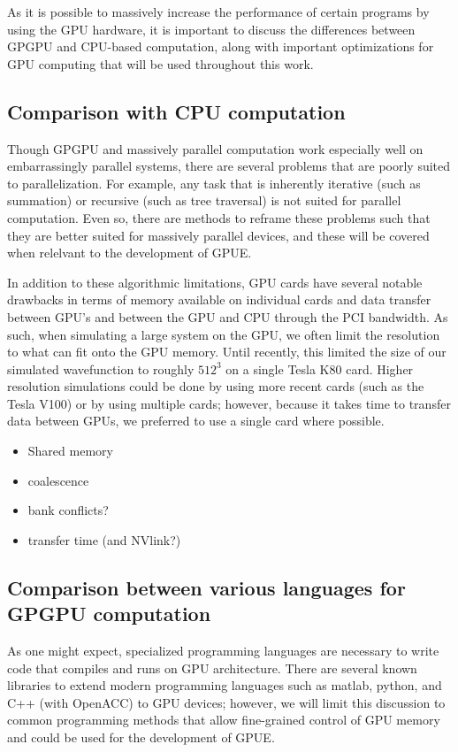 As it is possible to massively increase the performance of certain programs by using the GPU hardware, it is important to discuss the differences between GPGPU and CPU-based computation, along with important optimizations for GPU computing that will be used throughout this work.

\subsection{Comparison with CPU computation}

Though GPGPU and massively parallel computation work especially well on embarrassingly parallel systems, there are several problems that are poorly suited to parallelization.
For example, any task that is inherently iterative (such as summation) or recursive (such as tree traversal) is not suited for parallel computation.
Even so, there are methods to reframe these problems such that they are better suited for massively parallel devices, and these will be covered when relelvant to the development of GPUE.

In addition to these algorithmic limitations, GPU cards have several notable drawbacks in terms of memory available on individual cards and data transfer between GPU's and between the GPU and CPU through the PCI bandwidth.
As such, when simulating a large system on the GPU, we often limit the resolution to what can fit onto the GPU memory.
Until recently, this limited the size of our simulated wavefunction to roughly $512^3$ on a single Tesla K80 card.
Higher resolution simulations could be done by using more recent cards (such as the Tesla V100) or by using multiple cards; however, because it takes time to transfer data between GPUs, we preferred to use a single card where possible.

\begin{itemize}
\item Shared memory
\item coalescence
\item bank conflicts?
\item transfer time (and NVlink?)
\end{itemize}

\subsection{Comparison between various languages for GPGPU computation}

As one might expect, specialized programming languages are necessary to write code that compiles and runs on GPU architecture.
There are several known libraries to extend modern programming languages such as matlab, python, and C++ (with OpenACC) to GPU devices; however, we will limit this discussion to common programming methods that allow fine-grained control of GPU memory and could be used for the development of GPUE.

